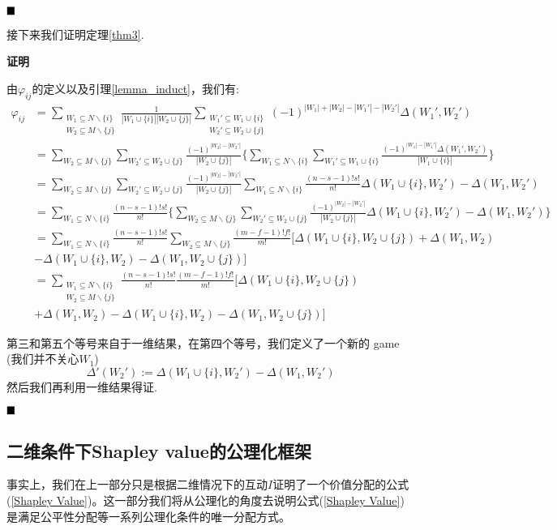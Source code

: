$\hfill\blacksquare$

接下来我们证明定理\ref{thm3}.

\textbf{证明}

由$\varphi_{ij}$的定义以及引理\ref{lemma_induct}，我们有:
\begin{align*}
	\varphi_{ij}&=\sum_{\substack{W_1\subseteq N\backslash\{i\}\\W_2\subseteq M\backslash\{j\}}}\frac{1}{|W_1\cup\{i\}||W_2\cup\{j\}|} \sum_{\substack{W_1'\subseteq W_1\cup\{i\}\\W_2'\subseteq W_2\cup\{j\}}}(-1)^{|W_1|+|W_2|-|W_1'|-|W_2'|}\Delta(W_1',W_2')\\
	&=\sum_{W_2\subseteq M\backslash\{j\}}
	\sum_{W_2'\subseteq W_2\cup\{j\}}\frac{(-1)^{|W_2|-|W_2'|}}{|W_2\cup\{j\}|}\{
	\sum_{W_1\subseteq N\backslash\{i\}}
	\sum_{W_1'\subseteq W_1\cup\{i\}}\frac{(-1)^{|W_1|-|W_1'|}\Delta(W_1',W_2')}{|W_1\cup\{i\}|}\}\\
	&=\sum_{W_2\subseteq M\backslash\{j\}}
	\sum_{W_2'\subseteq W_2\cup\{j\}}\frac{(-1)^{|W_2|-|W_2'|}}{|W_2\cup\{j\}|}
	\sum_{W_1\subseteq N\backslash\{i\}}\frac{(n-s-1)!s!}{n!}\Delta(W_1\cup \{i\},W_2')-\Delta(W_1,W_2')\\
	&=\sum_{W_1\subseteq N\backslash\{i\}}\frac{(n-s-1)!s!}{n!}
	\{\sum_{W_2\subseteq M\backslash\{j\}}
	\sum_{W_2'\subseteq W_2\cup\{j\}}\frac{(-1)^{|W_2|-|W_2'|}}{|W_2\cup\{j\}|}\Delta(W_1\cup \{i\},W_2')-\Delta(W_1,W_2')\}\\
	&=\sum_{W_1\subseteq N\backslash\{i\}}\frac{(n-s-1)!s!}{n!}
	\sum_{W_2\subseteq M\backslash\{j\}}\frac{(m-f-1)!f!}{m!}[\Delta(W_1\cup\{i\}, W_2\cup\{j\})
	+\Delta(W_1,W_2)\\
	&-\Delta(W_1\cup\{i\}, W_2)-\Delta(W_1, W_2\cup\{j\})]\\
	&=\sum_{\substack{W_1\subseteq N\backslash\{i\}\\W_2\subseteq M\backslash\{j\}}}\frac{(n-s-1)!s!}{n!}\frac{(m-f-1)!f!}{m!}[\Delta(W_1\cup\{i\}, W_2\cup\{j\})\\
	&+\Delta(W_1,W_2)-\Delta(W_1\cup\{i\}, W_2)-\Delta(W_1, W_2\cup\{j\})]
\end{align*}


第三和第五个等号来自于一维结果，在第四个等号，我们定义了一个新的
game (我们并不关心$W_1$)$$\Delta'(W_2'):=\Delta(W_1\cup \{i\},W_2')-\Delta(W_1,W_2')$$然后我们再利用一维结果得证.

$\hfill\blacksquare$

\subsection{二维条件下Shapley value的公理化框架}
事实上，我们在上一部分只是根据二维情况下的互动$I$证明了一个价值分配的公式(\ref{Shapley Value})。这一部分我们将从公理化的角度去说明公式(\ref{Shapley Value})是满足公平性分配等一系列公理化条件的唯一分配方式。


